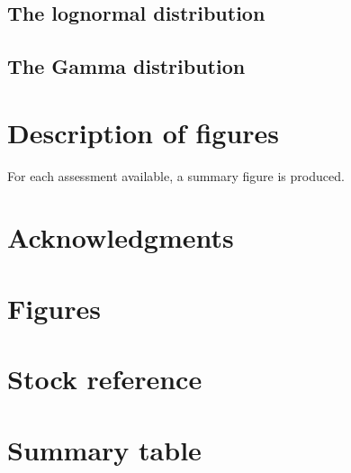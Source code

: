\documentclass[a4paper,10pt]{article}
\begin{document}
\subsection{The lognormal distribution}

\subsection{The Gamma distribution}


\section{Description of figures}
For each assessment available, a summary figure is produced. 

\section{Acknowledgments}


\appendix

\section{Figures}

\section{Stock reference}

\section{Summary table}


%


\end{document}
